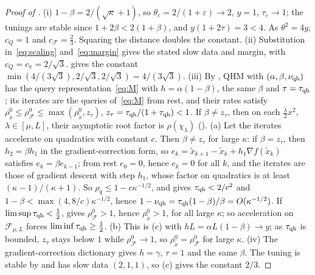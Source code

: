 \documentclass[11pt]{article}
\theoremstyle{definition}
\theoremstyle{remark}
\newcommand{\cF}{\mathcal F}
\newcommand{\rhoz}{\rho_{\cF}^{0}}
\newcommand{\cQ}{c_{Q}}
\newcommand{\cFF}{c_{\cF}}
\newcommand{\cpi}{c_{\pi}}
\begin{document}
\begin{proof}[Proof of ]
(i) \(1-\beta=2/(\sqrt\kappa+1)\), so \(\theta_\varepsilon=2/(1+\varepsilon)\to2\), \(y=1\), \(\tau_\varepsilon\to1\);
the tunings are stable since \(1+2\beta<2(1+\beta)\), and \(y(1+2\tau)=3<4\).  As
\(\theta^2=4y\), \(\cQ=1\) and \(\cFF=\frac23\).  Squaring the distance doubles the
constant.
(ii) Substitution in~\eqref{eq:scaling} and~\eqref{eq:margin} gives the stated slow data and margin,
with \(\cQ=\cpi=2/\sqrt3\).   gives the constant
\(\min(4/(3\sqrt3),2/\sqrt3,2/\sqrt3)=4/(3\sqrt3)\).
(iii) By , QHM with \((\alpha,\beta,\nu_{\rm qh})\) has the query representation~\eqref{eq:M} with
\(h=\alpha(1-\beta)\), the same \(\beta\) and \(\tau=\tau_{\rm qh}\); its iterates are the queries of~\eqref{eq:M} from rest, and their rates
satisfy \(\rho^0_{\tilde x}\le\rhoz\le\max(\rho^0_{\tilde x},z_\tau)\), \(z_\tau=\tau_{\rm qh}/(1+\tau_{\rm qh})<1\).  If \(\beta\ne z_\tau\), then on each
\(\frac\lambda2x^2\), \(\lambda\in[\mu,L]\), their asymptotic root factor is \(\rho(\chi_\lambda)\) ().
(a) Let the iterates accelerate on quadratics with constant \(c\).  Then \(\beta\ne z_\tau\) for large \(\kappa\): if \(\beta=z_\tau\), then
\(h_2=\beta h_1\) in the gradient-correction form, so \(e_k=\tilde x_{k+1}-\tilde x_k+h_1\nabla f(\tilde x_k)\) satisfies \(e_k=\beta e_{k-1}\); from rest
\(e_0=0\), hence \(e_k=0\) for all \(k\), and the iterates are those of gradient descent with step \(h_1\), whose
factor on quadratics is at least \((\kappa-1)/(\kappa+1)\).  So \(\rho_q\le1-c\kappa^{-1/2}\), and  gives \(\tau_{\rm qh}<2/c^2\) and \(1-\beta<\max(4,8/c)\kappa^{-1/2}\), hence
\(1-\nu_{\rm qh}=\tau_{\rm qh}(1-\beta)/\beta=O(\kappa^{-1/2})\).  If \(\limsup\tau_{\rm qh}<\frac12\),  gives \(\rhoz>1\), hence
\(\rho^0_{\tilde x}>1\), for all large \(\kappa\); so acceleration on \(\cF_{\mu,L}\) forces \(\liminf\tau_{\rm qh}\ge\frac12\).  (b) This is
(c) with \(hL=\alpha L(1-\beta)\to y\); as \(\tau_{\rm qh}\) is bounded, \(z_\tau\) stays below \(1\) while
\(\rhoz\to1\), so \(\rho^0_{\tilde x}=\rhoz\) for large \(\kappa\).
(iv) The gradient-correction dictionary gives \(h=\gamma\), \(\tau=1\) and the same \(\beta\).
The tuning is stable by  and has slow data \((2,1,1)\), so
(c) gives the constant \(2/3\).


\end{proof}
\end{document}
